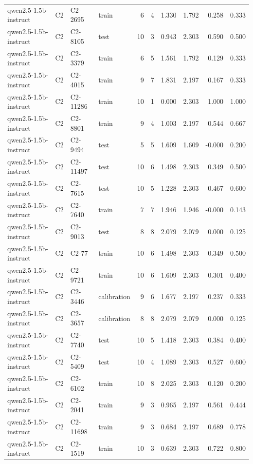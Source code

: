 \begin{table}
\begin{tabular}{llllrrrrrr}
qwen2.5-1.5b-instruct & C2 & C2-2695 & train & 6 & 4 & 1.330 & 1.792 & 0.258 & 0.333 \\
qwen2.5-1.5b-instruct & C2 & C2-8105 & test & 10 & 3 & 0.943 & 2.303 & 0.590 & 0.500 \\
qwen2.5-1.5b-instruct & C2 & C2-3379 & train & 6 & 5 & 1.561 & 1.792 & 0.129 & 0.333 \\
qwen2.5-1.5b-instruct & C2 & C2-4015 & train & 9 & 7 & 1.831 & 2.197 & 0.167 & 0.333 \\
qwen2.5-1.5b-instruct & C2 & C2-11286 & train & 10 & 1 & 0.000 & 2.303 & 1.000 & 1.000 \\
qwen2.5-1.5b-instruct & C2 & C2-8801 & train & 9 & 4 & 1.003 & 2.197 & 0.544 & 0.667 \\
qwen2.5-1.5b-instruct & C2 & C2-9494 & test & 5 & 5 & 1.609 & 1.609 & -0.000 & 0.200 \\
qwen2.5-1.5b-instruct & C2 & C2-11497 & test & 10 & 6 & 1.498 & 2.303 & 0.349 & 0.500 \\
qwen2.5-1.5b-instruct & C2 & C2-7615 & test & 10 & 5 & 1.228 & 2.303 & 0.467 & 0.600 \\
qwen2.5-1.5b-instruct & C2 & C2-7640 & train & 7 & 7 & 1.946 & 1.946 & -0.000 & 0.143 \\
qwen2.5-1.5b-instruct & C2 & C2-9013 & test & 8 & 8 & 2.079 & 2.079 & 0.000 & 0.125 \\
qwen2.5-1.5b-instruct & C2 & C2-77 & train & 10 & 6 & 1.498 & 2.303 & 0.349 & 0.500 \\
qwen2.5-1.5b-instruct & C2 & C2-9721 & train & 10 & 6 & 1.609 & 2.303 & 0.301 & 0.400 \\
qwen2.5-1.5b-instruct & C2 & C2-3446 & calibration & 9 & 6 & 1.677 & 2.197 & 0.237 & 0.333 \\
qwen2.5-1.5b-instruct & C2 & C2-3657 & calibration & 8 & 8 & 2.079 & 2.079 & 0.000 & 0.125 \\
qwen2.5-1.5b-instruct & C2 & C2-7740 & test & 10 & 5 & 1.418 & 2.303 & 0.384 & 0.400 \\
qwen2.5-1.5b-instruct & C2 & C2-5409 & test & 10 & 4 & 1.089 & 2.303 & 0.527 & 0.600 \\
qwen2.5-1.5b-instruct & C2 & C2-6102 & train & 10 & 8 & 2.025 & 2.303 & 0.120 & 0.200 \\
qwen2.5-1.5b-instruct & C2 & C2-2041 & train & 9 & 3 & 0.965 & 2.197 & 0.561 & 0.444 \\
qwen2.5-1.5b-instruct & C2 & C2-11698 & train & 9 & 3 & 0.684 & 2.197 & 0.689 & 0.778 \\
qwen2.5-1.5b-instruct & C2 & C2-1519 & train & 10 & 3 & 0.639 & 2.303 & 0.722 & 0.800 \\

\end{tabular}
\end{table}
